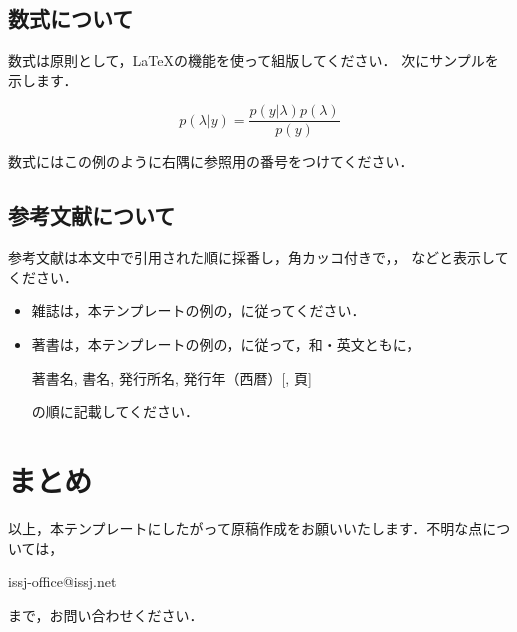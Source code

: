 \documentclass[dvipdfmx]{issj}
\begin{document}
\subsection{数式について}  %

数式は原則として，{\LaTeX}の機能を使って組版してください．
次にサンプルを示します．

\begin{equation}
	p( \lambda \vert y  ) = \frac{p( y \vert \lambda ) p( \lambda )}{p( y )}
\end{equation}


数式にはこの例のように右隅に参照用の番号をつけてください．

\subsection{参考文献について}  %

参考文献は本文中で引用された順に採番し，角カッコ付きで\cite{bib:SO2004}，\cite{bib:HV1987}，
\cite{bib:NT1996}などと表示してください．

\begin{itemize}
\item[] 雑誌は，本テンプレートの例の\cite{bib:SO2004}，\cite{bib:HV1987}に従ってください．
\item[] 著書は，本テンプレートの例の\cite{bib:NT1996}，\cite{bib:K19751976}に従って，和・英文ともに，
      \begin{center}
          著書名, 書名, 発行所名, 発行年（西暦）[, 頁]
      \end{center}の順に記載してください．
\end{itemize}

\section{まとめ}  %

以上，本テンプレートにしたがって原稿作成をお願いいたします．不明な点については，
\begin{center}
    issj-office@issj.net
\end{center}
まで，お問い合わせください．
\end{document}
